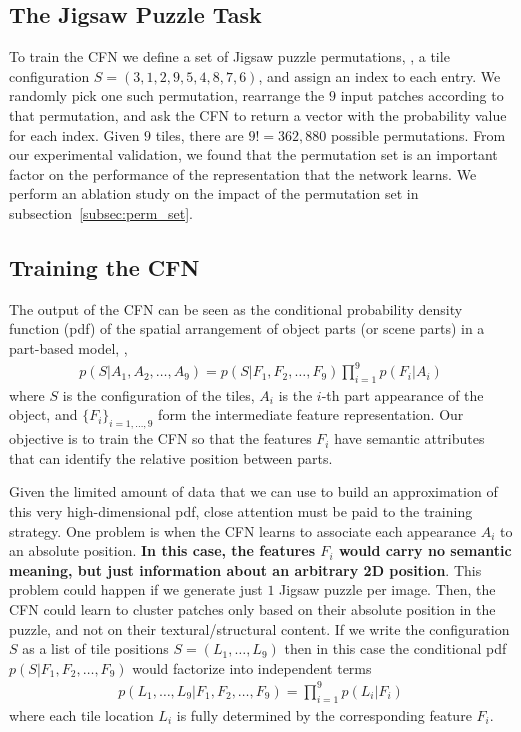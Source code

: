 \documentclass[runningheads]{llncs}
\begin{document}
\subsection{The Jigsaw Puzzle Task} 

To train the CFN we define a set of Jigsaw puzzle permutations, \eg, a tile configuration $S = (3,1,2,9,5,4,8,7,6)$, and assign an index to each entry. We randomly pick one such permutation, rearrange the $9$ input patches according to that permutation, and ask the CFN to return a vector with the probability value for each index. Given $9$ tiles, there are $9! = 362{,}880$ possible permutations. From our experimental validation, we found that the permutation set is an important factor on the performance of the representation that the network learns. We perform an ablation study on the impact of the permutation set in subsection~\ref{subsec:perm_set}.


\subsection{Training the CFN}

The output of the CFN can be seen as the conditional probability density function (pdf) of the spatial arrangement of object parts (or scene parts) in a part-based model, \ie,
\begin{align}
p(S|A_1,A_2,\dots,A_9) =  p(S|F_1,F_2,\dots,F_9) \prod_{i=1}^9 p(F_i|A_i)
\end{align}
where $S$ is the configuration of the tiles, $A_i$ is the $i$-th part appearance of the object, and $\{F_i\}_{i=1,\dots,9}$ form the intermediate feature representation.
Our objective is to train the CFN so that the features $F_i$ have semantic attributes that can identify the relative position between parts.

Given the limited amount of data that we can use to build an approximation of this very high-dimensional pdf, close attention must be paid to the training strategy. One problem is when the CFN learns to associate each appearance $A_i$ to an absolute position. \textbf{In this case, the features $F_i$ would carry no semantic meaning, but just information about an arbitrary 2D position}. This problem could happen if we generate just $1$ Jigsaw puzzle per image. Then, the CFN could learn to cluster patches only based on their absolute position in the puzzle, and not on their textural/structural content. If we write the configuration $S$ as a list of tile positions $S=(L_1,\dots,L_9)$ then in this case the conditional pdf $p(S|F_1,F_2,\dots,F_9)$ would factorize into independent terms
\begin{align}
p(L_1,\dots,L_9|F_1,F_2,\dots,F_9) = \prod_{i=1}^9 p(L_i|F_i)
\end{align}
where each tile location $L_i$ is fully determined by the corresponding feature $F_i$. 
\end{document}

